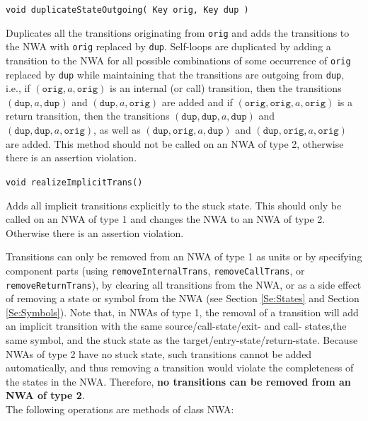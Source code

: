 \documentclass{llncs}
\begin{document}
\begin{description}
  \item\texttt{void duplicateStateOutgoing( Key orig, Key dup )}

    Duplicates all the transitions originating from \texttt{orig} and adds the transitions to the NWA with \texttt{orig} replaced by \texttt{dup}.  Self-loops are duplicated by adding a transition to the NWA for all possible combinations of some occurrence of \texttt{orig} replaced by \texttt{dup} while maintaining that the transitions are outgoing from \texttt{dup}, i.e., if $(\texttt{orig},a,\texttt{orig})$ is an internal (or call) transition, then the transitions $(\texttt{dup},a,\texttt{dup})$ and $(\texttt{dup},a,\texttt{orig})$ are added and if $(\texttt{orig},\texttt{orig},a,\texttt{orig})$ is a return transition, then the transitions $(\texttt{dup},\texttt{dup},a,\texttt{dup})$ and $(\texttt{dup},\texttt{dup},a,\texttt{orig})$, as well as $(\texttt{dup},\texttt{orig},a,\texttt{dup})$ and $(\texttt{dup},\texttt{orig},a,\texttt{orig})$ are added.  This method should not be called on an NWA of type 2, otherwise there is an assertion violation.

  \item\texttt{void realizeImplicitTrans()}

    Adds all implicit transitions explicitly to the stuck state.  This should only be called on an NWA of type 1 and changes the NWA to an NWA of type 2.  Otherwise there is an assertion violation. \\

\end{description}

Transitions can only be removed from an NWA of type 1 as units or by specifying component parts (using \texttt{removeInternalTrans}, \texttt{removeCallTrans}, or \texttt{removeReturnTrans}), by clearing all transitions from the NWA, or as a side effect of removing a state or symbol from the NWA (see Section \ref{Se:States} and Section \ref{Se:Symbols}).  Note that, in NWAs of type 1, the removal of a transition will add an implicit transition with the same source/call-state/exit- and call- states,the same symbol, and the stuck state as the target/entry-state/return-state.  Because NWAs of type 2 have no stuck state, such transitions cannot be added automatically, and thus removing a transition would violate the completeness of the states in the NWA.  Therefore, \textbf{no transitions can be removed from an NWA of type 2}. \\ 

\noindent The following operations are methods of class NWA:
\end{document}

